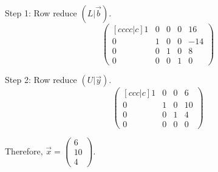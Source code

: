 \noindent
Step 1: Row reduce \((L|\Vec{b})\).
\begin{equation}
    \begin{pmatrix}[cccc|c]
        1 & 0 & 0 & 0 & 16 \\
        0 & 1 & 0 & 0 & -14 \\
        0 & 0 & 1 & 0 & 8 \\
        0 & 0 & 0 & 1 & 0
    \end{pmatrix}
\end{equation}

\noindent
Step 2: Row reduce \((U|\Vec{y})\).
\begin{equation}
    \begin{pmatrix}[ccc|c]
        1 & 0 & 0 & 6 \\
        0 & 1 & 0 & 10 \\
        0 & 0 & 1 & 4 \\
        0 & 0 & 0 & 0
    \end{pmatrix}
\end{equation}

\noindent
\newline
Therefore, \(\Vec{x} = \begin{pmatrix}
    6 \\ 10 \\ 4
\end{pmatrix}\).